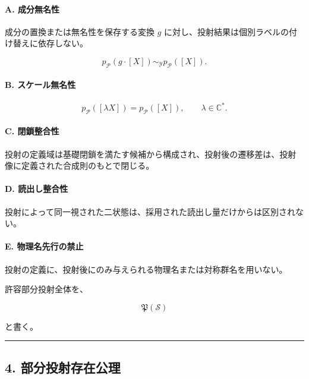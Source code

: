 \documentclass[
  a4paper,
  ja=minimal,
  xelatex,
  paragraph-mark={},
]{bxjsarticle}
\begin{document}
\paragraph{A. 成分無名性}\label{a.-ux6210ux5206ux7121ux540dux6027}

成分の置換または無名性を保存する変換 \(g\)
に対し、投射結果は個別ラベルの付け替えに依存しない。

\[
p_{\mathcal P}(g\cdot[X])
\sim_{\mathscr Y}
p_{\mathcal P}([X]).
\]

\paragraph{B.
スケール無名性}\label{b.-ux30b9ux30b1ux30fcux30ebux7121ux540dux6027}

\[
p_{\mathcal P}([\lambda X])
{}=
p_{\mathcal P}([X]),
\qquad
\lambda\in\mathbb C^\ast.
\]

\paragraph{C. 閉鎖整合性}\label{c.-ux9589ux9396ux6574ux5408ux6027}

投射の定義域は基礎閉鎖を満たす候補から構成され、投射後の遷移差は、投射像に定義された合成則のもとで閉じる。

\paragraph{D.
読出し整合性}\label{d.-ux8aadux51faux3057ux6574ux5408ux6027}

投射によって同一視された二状態は、採用された読出し量だけからは区別されない。

\paragraph{E.
物理名先行の禁止}\label{e.-ux7269ux7406ux540dux5148ux884cux306eux7981ux6b62}

投射の定義に、投射後にのみ与えられる物理名または対称群名を用いない。

許容部分投射全体を、

\[
\mathfrak P(\mathscr S)
\]

と書く。

\begin{center}\rule{0.5\linewidth}{0.5pt}\end{center}

\subsection{4.
部分投射存在公理}\label{ux90e8ux5206ux6295ux5c04ux5b58ux5728ux516cux7406}
\end{document}

